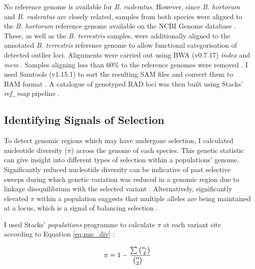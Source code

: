 \documentclass[12pt]{article}
\begin{document}
\begin{linenumbers}
    	No reference genome is available for \emph{B. ruderatus}. However, since \emph{B. hortorum} and \emph{B. ruderatus} are closely related, samples from both species were aligned to the \emph{B. hortorum} reference genome available on the NCBI Genome database \citep{ellis_delineating_2005, ncbi_iybomhort11_2021, sayers_database_2022}.
    	These, as well as the \emph{B. terrestris} samples, were additionally aligned to the annotated \emph{B. terrestris} reference genome \citep{ncbi_iybomterr12_2022} to allow functional categorisation of detected outlier loci. Alignments were carried out using BWA (v0.7.17) \emph{index} and \emph{mem} \citep{li_fast_2009, li2013aligning}.
		Samples aligning less than 60\% to the reference genomes were removed \citep{rochette_deriving_2017}.
    	I used Samtools (v1.15.1) to sort the resulting SAM files and convert them to BAM format \citep{danecek_twelve_2021}. A catalogue of genotyped RAD loci was then built using Stacks' \emph{ref\_map} pipeline \citep{catchen_stacks_2013}. 

		
		\subsection{Identifying Signals of Selection}
		
		To detect genomic regions which may have undergone selection, I calculated nucleotide diversity ($\pi$) across the genome of each species. This genetic statistic can give insight into different types of selection within a populations' genome. Significantly reduced nucleotide diversity can be indicative of past selective sweeps during which genetic variation was reduced in a genomic region due to linkage disequilibrium with the selected variant \citep{hohenlohe_population_2012, mollion_patterns_2017, pracana_fire_2017}. Alternatively, significantly elevated $\pi$ within a population suggests that multiple alleles are being maintained at a locus, which is a signal of balancing selection \citep{davey_radseq_2010, hohenlohe_using_2010}.
		
		I used Stacks' \emph{populations} programme to calculate $\pi$ at each variant site according to Equation \ref{eq:nuc_div} \citep{catchen_stacks_2013}:
		
		\begin{equation}
			\pi = 1 - \frac{\sum{n_i \choose 2} \\~\\}{{n \choose 2} \\~\\}
			\label{eq:nuc_div}
		\end{equation}
		

\end{linenumbers}
\end{document}
